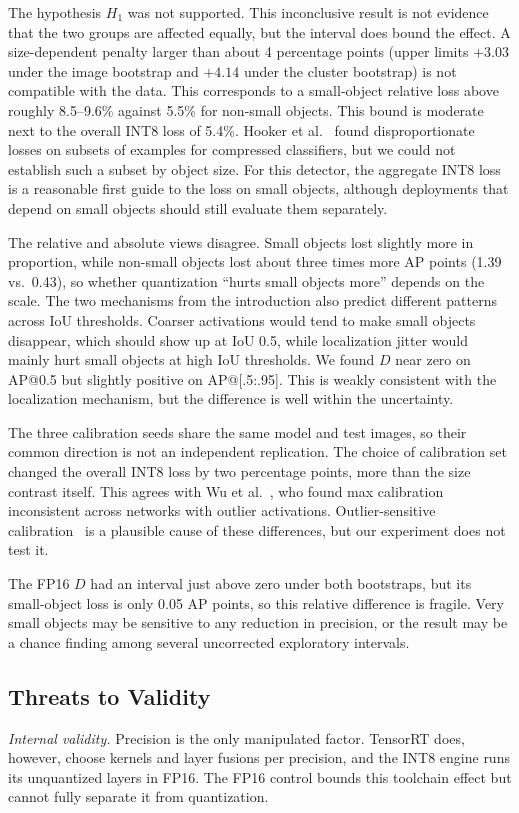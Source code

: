 \documentclass[conference]{IEEEtran}
\begin{document}
The hypothesis $H_1$ was not supported. This inconclusive result is not evidence that the two
groups are affected equally, but the interval does bound the effect. A size-dependent penalty
larger than about 4 percentage points (upper limits $+3.03$ under the image bootstrap and $+4.14$
under the cluster bootstrap) is not compatible with the data. This corresponds to a small-object
relative loss above roughly 8.5--9.6\% against 5.5\% for non-small objects. This bound is moderate next
to the overall INT8 loss of 5.4\%. Hooker et
al.~\cite{hooker2019forget} found disproportionate losses on subsets of examples for compressed
classifiers, but we could not establish such a subset by object size. For this detector, the
aggregate INT8 loss is a reasonable first guide to the loss on small objects, although
deployments that depend on small objects should still evaluate them separately.

The relative and absolute views disagree. Small objects lost slightly more in proportion, while
non-small objects lost about three times more AP points (1.39 vs.\ 0.43), so whether
quantization ``hurts small objects more'' depends on the scale. The two mechanisms from the
introduction also predict different patterns across IoU thresholds. Coarser activations would
tend to make small objects disappear, which should show up at IoU 0.5, while localization jitter
would mainly hurt small objects at high IoU thresholds. We found $D$ near zero on AP@0.5 but
slightly positive on AP@[.5:.95]. This is weakly consistent with the localization mechanism, but
the difference is well within the uncertainty.

The three calibration seeds share the same model and test images, so their common direction is
not an independent replication. The choice of calibration set changed the overall INT8 loss by
two percentage points, more than the size contrast itself. This agrees with Wu et
al.~\cite{wu2020integer}, who found max calibration inconsistent across networks with outlier
activations. Outlier-sensitive calibration~\cite{kim2026inlier} is a plausible cause of these
differences, but our experiment does not test it.

The FP16 $D$ had an interval just above zero under both bootstraps, but its small-object loss is
only 0.05 AP points, so this relative difference is fragile. Very small objects may be sensitive to any reduction in
precision, or the result may be a chance finding among several uncorrected exploratory
intervals.

\subsection{Threats to Validity}
\emph{Internal validity.} Precision is the only manipulated factor. TensorRT does, however, choose
kernels and layer fusions per precision, and the INT8 engine runs its unquantized layers in FP16.
The FP16 control bounds this toolchain effect but cannot fully separate it from quantization.
\end{document}
